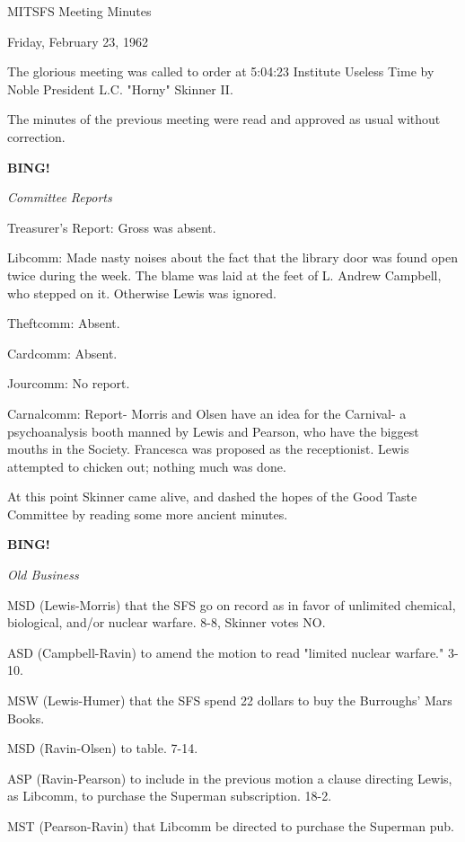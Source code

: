 \documentclass[12pt]{article}
\newcommand{\bing}{{\bf BING!} }
\newcommand{\goto}[1]{\bing \vskip 12pt \centerline{{\em{#1}}}}
\begin{document}
\begin{center}

MITSFS Meeting Minutes

Friday, February 23, 1962

\end{center}
 
\vspace{12pt}

\setlength{\parskip}{6pt}

\noindent
The glorious meeting was called to order at 5:04:23 Institute Useless Time by Noble President L.C. "Horny" Skinner II.

The minutes of the previous meeting were read and approved as usual without correction.

\goto{Committee Reports}

Treasurer's Report: Gross was absent.

Libcomm: Made nasty noises about the fact that the library door was found open twice during the week. The blame was laid at the feet of L. Andrew Campbell, who stepped on it. Otherwise Lewis was ignored.

Theftcomm: Absent.

Cardcomm: Absent.

Jourcomm: No report.

Carnalcomm: Report- Morris and Olsen have an idea for the Carnival- a psychoanalysis booth manned by Lewis and Pearson, who have the biggest mouths in the Society. Francesca was proposed as the receptionist. Lewis attempted to chicken out; nothing much was done.

At this point Skinner came alive, and dashed the hopes of the Good Taste Committee by reading some more ancient minutes.

\goto{Old Business}

MSD (Lewis-Morris) that the SFS go on record as in favor of unlimited chemical, biological, and/or nuclear warfare. 8-8, Skinner votes NO.

ASD (Campbell-Ravin) to amend the motion to read "limited nuclear warfare." 3-10.

MSW (Lewis-Humer) that the SFS spend 22 dollars to buy the Burroughs' Mars Books.

MSD (Ravin-Olsen) to table. 7-14.

ASP (Ravin-Pearson) to include in the previous motion a clause directing Lewis, as Libcomm, to purchase the Superman subscription. 18-2.

MST (Pearson-Ravin) that Libcomm be directed to purchase the Superman pub.
\end{document}
